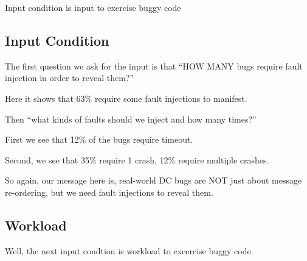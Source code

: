 Input condition is input to exercise buggy code

%
%

\subsection{Input Condition}

The first question we ask for the input is that ``HOW MANY bugs require fault
injection in order to reveal them?''


Here it shows that 63\% require some fault injections to manifest.

Then ``what kinds of faults should we inject and how many times?''

First we see that 12\% of the bugs require timeout.

Second, we see that 35\% require 1 crash, 12\% require multiple crashes.

So again, our message here is, real-world DC bugs are NOT just about message
re-ordering, but we need fault injections to reveal them.



\subsection{Workload}



Well, the next input condtion is workload to excercise buggy code.

